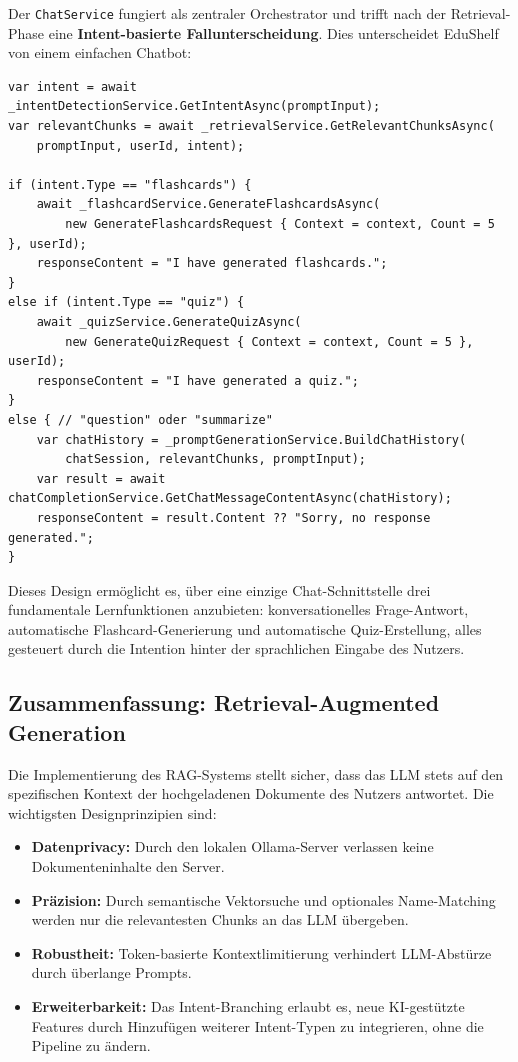 Der \texttt{ChatService} fungiert als zentraler Orchestrator und trifft nach der Retrieval-Phase eine \textbf{Intent-basierte Fallunterscheidung}. Dies unterscheidet EduShelf von einem einfachen Chatbot:

\begin{lstlisting}[language={[Sharp]C}, caption={Intent-basiertes Branching in ChatService.cs}]
var intent = await _intentDetectionService.GetIntentAsync(promptInput);
var relevantChunks = await _retrievalService.GetRelevantChunksAsync(
    promptInput, userId, intent);

if (intent.Type == "flashcards") {
    await _flashcardService.GenerateFlashcardsAsync(
        new GenerateFlashcardsRequest { Context = context, Count = 5 }, userId);
    responseContent = "I have generated flashcards.";
}
else if (intent.Type == "quiz") {
    await _quizService.GenerateQuizAsync(
        new GenerateQuizRequest { Context = context, Count = 5 }, userId);
    responseContent = "I have generated a quiz.";
}
else { // "question" oder "summarize"
    var chatHistory = _promptGenerationService.BuildChatHistory(
        chatSession, relevantChunks, promptInput);
    var result = await chatCompletionService.GetChatMessageContentAsync(chatHistory);
    responseContent = result.Content ?? "Sorry, no response generated.";
}
\end{lstlisting}

Dieses Design erm\"oglicht es, \"uber eine einzige Chat-Schnittstelle drei fundamentale Lernfunktionen anzubieten: konversationelles Frage-Antwort, automatische Flashcard-Generierung und automatische Quiz-Erstellung, alles gesteuert durch die Intention hinter der sprachlichen Eingabe des Nutzers.

\subsection{Zusammenfassung: Retrieval-Augmented Generation \cite{lewisRAG2020}}
Die Implementierung des RAG-Systems stellt sicher, dass das LLM stets auf den spezifischen Kontext der hochgeladenen Dokumente des Nutzers antwortet. Die wichtigsten Designprinzipien sind:
\begin{itemize}
    \item \textbf{Datenprivacy:} Durch den lokalen Ollama-Server verlassen keine Dokumenteninhalte den Server.
    \item \textbf{Pr\"azision:} Durch semantische Vektorsuche und optionales Name-Matching werden nur die relevantesten Chunks an das LLM \"ubergeben.
    \item \textbf{Robustheit:} Token-basierte Kontextlimitierung verhindert LLM-Abst\"urze durch \"uberlange Prompts.
    \item \textbf{Erweiterbarkeit:} Das Intent-Branching erlaubt es, neue KI-gest\"utzte Features durch Hinzuf\"ugen weiterer Intent-Typen zu integrieren, ohne die Pipeline zu \"andern.
\end{itemize}

